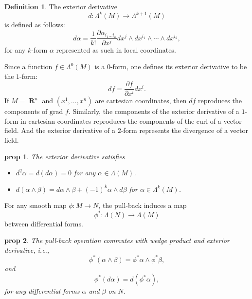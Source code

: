 \documentclass[a4paper]{article}
\DeclareMathOperator{\R}{\mathbf{R}}
\theoremstyle{definition}
\newtheorem{defn}{Definition}
\theoremstyle{plain}
\newtheorem{prop}{prop}
\begin{document}
    \begin{defn}
        The exterior derivative
        \begin{equation}
            d
            : \Lambda^{k}(M)
            \to \Lambda^{k+1}(M)    
        \end{equation}
        is defined as follows:
        \begin{equation}
            d\alpha
            = \frac{1}{k!} \frac{\partial \alpha_{i_1\ldots
            i_k}}{\partial x^{j}} dx^{j} \wedge dx^{i_1}
            \wedge \cdots \wedge dx^{i_k},
        \end{equation}
        for any $k$-form $\alpha$ represented as such in
        local coordinates.
    \end{defn}
    Since a function $f \in \Lambda^{0}(M)$ is a $0$-form,
    one defines its exterior derivative to be the $1$-form:
    \begin{equation}
        df
        = \frac{\partial f}{\partial x^{i}} dx^{i}.
    \end{equation}
    If $M = \R^{n}$ and $(x^{1},\ldots,x^{n})$ are cartesian
    coordinates, then $df$ reproduces the components of
    $\text{grad }f$. Similarly, the components of the
    exterior derivative of a $1$-form in cartesian
    coordinates reproduces the components of the curl of a
    vector field. And the exterior derivative of a $2$-form
    represents the divergence of a vector field.

    \begin{prop}
        The exterior derivative satisfies
        \begin{itemize}
            \item $d^2\alpha = d(d\alpha) = 0$ for any
                $\alpha \in \Lambda(M)$.
            \item $d(\alpha \wedge \beta) = d\alpha \wedge
                \beta + (-1)^{k} \alpha \wedge d\beta$ for
                $\alpha \in \Lambda^{k}(M)$.
        \end{itemize}
    \end{prop}

    For any smooth map $\phi : M \to N$, the pull-back
    induces a map
    \begin{equation}
        \phi^{*} : \Lambda(N) \to \Lambda(M)
    \end{equation}
    between differential forms.

    \begin{prop}
        The pull-back operation commutes with wedge product
        and exterior derivative, i.e.,
        \begin{equation}
            \phi^{*}(\alpha \wedge \beta)
            = \phi^{*}\alpha \wedge \phi^{*}\beta,
        \end{equation}
        and
        \begin{equation}
            \phi^{*}(d\alpha)
            = d(\phi^{*}\alpha),
        \end{equation}
        for any differential forms $\alpha$ and $\beta$ on
        $N$. 
    \end{prop}
\end{document}
